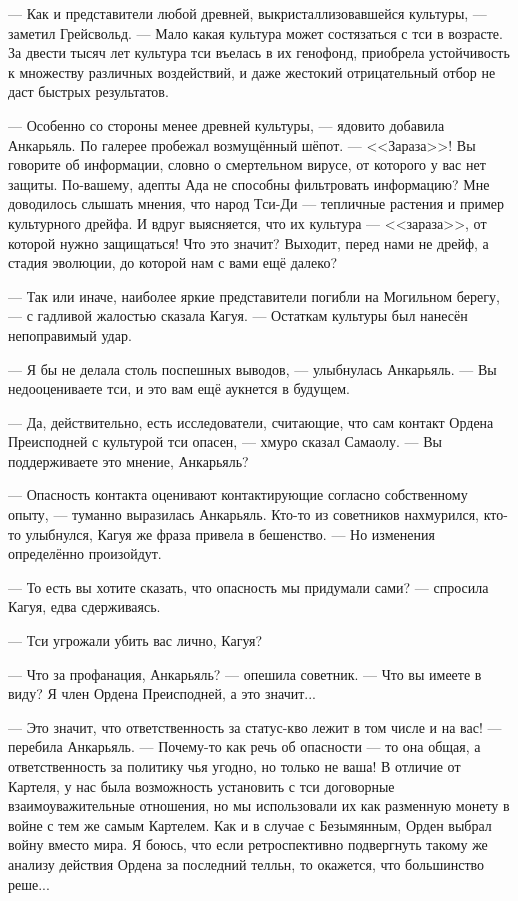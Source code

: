 --- Как и представители любой древней, выкристаллизовавшейся культуры, --- заметил Грейсвольд.
--- Мало какая культура может состязаться с тси в возрасте.
За двести тысяч лет культура тси въелась в их генофонд, приобрела устойчивость к множеству различных воздействий, и даже жестокий отрицательный отбор не даст быстрых результатов.

--- Особенно со стороны менее древней культуры, --- ядовито добавила Анкарьяль.
По галерее пробежал возмущённый шёпот.
--- <<Зараза>>!
Вы говорите об информации, словно о смертельном вирусе, от которого у вас нет защиты.
По-вашему, адепты Ада не способны фильтровать информацию?
Мне доводилось слышать мнения, что народ Тси-Ди --- тепличные растения и пример культурного дрейфа\FM.
И вдруг выясняется, что их культура --- <<зараза>>, от которой нужно защищаться!
Что это значит?
Выходит, перед нами не дрейф, а стадия эволюции, до которой нам с вами ещё далеко?

--- Так или иначе, наиболее яркие представители погибли на Могильном берегу, --- с гадливой жалостью сказала Кагуя.
--- Остаткам культуры был нанесён непоправимый удар.

--- Я бы не делала столь поспешных выводов, --- улыбнулась Анкарьяль.
--- Вы недооцениваете тси, и это вам ещё аукнется в будущем.

--- Да, действительно, есть исследователи, считающие, что сам контакт Ордена Преисподней с культурой тси опасен, --- хмуро сказал Самаолу.
--- Вы поддерживаете это мнение, Анкарьяль?

--- Опасность контакта оценивают контактирующие согласно собственному опыту, --- туманно выразилась Анкарьяль.
Кто-то из советников нахмурился, кто-то улыбнулся, Кагуя же фраза привела в бешенство.
--- Но изменения определённо произойдут.

--- То есть вы хотите сказать, что опасность мы придумали сами? --- спросила Кагуя, едва сдерживаясь.

--- Тси угрожали убить вас лично, Кагуя?

--- Что за профанация, Анкарьяль? --- опешила советник.
--- Что вы имеете в виду?
Я член Ордена Преисподней, а это значит...

--- Это значит, что ответственность за статус-кво лежит в том числе и на вас! --- перебила Анкарьяль.
--- Почему-то как речь об опасности --- то она общая, а ответственность за политику чья угодно, но только не ваша!
В отличие от Картеля, у нас была возможность установить с тси договорные взаимоуважительные отношения, но мы использовали их как разменную монету в войне с тем же самым Картелем.
Как и в случае с Безымянным, Орден выбрал войну вместо мира.
Я боюсь, что если ретроспективно подвергнуть такому же анализу действия Ордена за последний телльн, то окажется, что большинство реше...

